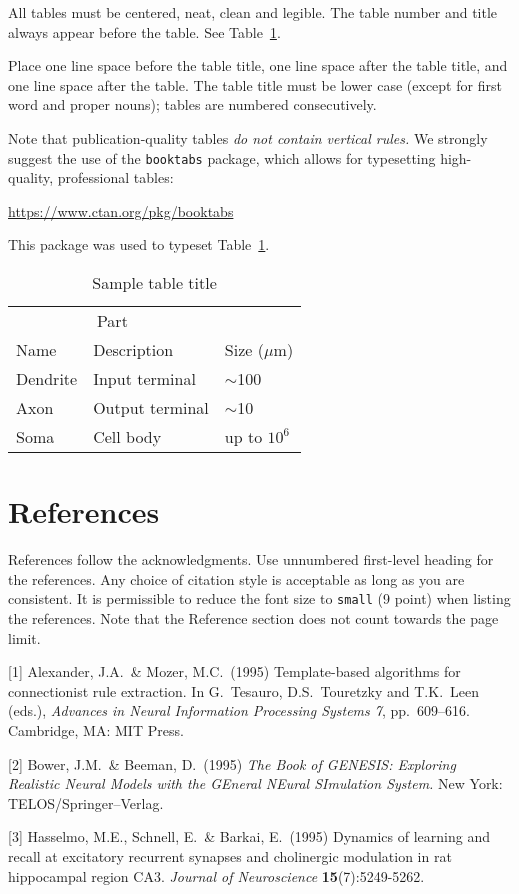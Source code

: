 \documentclass{article}
\begin{document}
All tables must be centered, neat, clean and legible.  The table number and
title always appear before the table.  See Table~\ref{sample-table}.


Place one line space before the table title, one line space after the
table title, and one line space after the table. The table title must
be lower case (except for first word and proper nouns); tables are
numbered consecutively.


Note that publication-quality tables \emph{do not contain vertical rules.} We
strongly suggest the use of the \verb+booktabs+ package, which allows for
typesetting high-quality, professional tables:
\begin{center}
  \url{https://www.ctan.org/pkg/booktabs}
\end{center}
This package was used to typeset Table~\ref{sample-table}.


\begin{table}
  \caption{Sample table title}
  \label{sample-table}
  \centering
  \begin{tabular}{lll}
    \toprule
    \multicolumn{2}{c}{Part}                   \\
    \cmidrule(r){1-2}
    Name     & Description     & Size ($\mu$m) \\
    \midrule
    Dendrite & Input terminal  & $\sim$100     \\
    Axon     & Output terminal & $\sim$10      \\
    Soma     & Cell body       & up to $10^6$  \\
    \bottomrule
  \end{tabular}
\end{table}


\section*{References}


References follow the acknowledgments. Use unnumbered first-level heading for
the references. Any choice of citation style is acceptable as long as you are
consistent. It is permissible to reduce the font size to \verb+small+ (9 point)
when listing the references.
Note that the Reference section does not count towards the page limit.
\medskip


{
\small


[1] Alexander, J.A.\ \& Mozer, M.C.\ (1995) Template-based algorithms for
connectionist rule extraction. In G.\ Tesauro, D.S.\ Touretzky and T.K.\ Leen
(eds.), {\it Advances in Neural Information Processing Systems 7},
pp.\ 609--616. Cambridge, MA: MIT Press.


[2] Bower, J.M.\ \& Beeman, D.\ (1995) {\it The Book of GENESIS: Exploring
  Realistic Neural Models with the GEneral NEural SImulation System.}  New York:
TELOS/Springer--Verlag.


[3] Hasselmo, M.E., Schnell, E.\ \& Barkai, E.\ (1995) Dynamics of learning and
recall at excitatory recurrent synapses and cholinergic modulation in rat
hippocampal region CA3. {\it Journal of Neuroscience} {\bf 15}(7):5249-5262.
}
\end{document}
